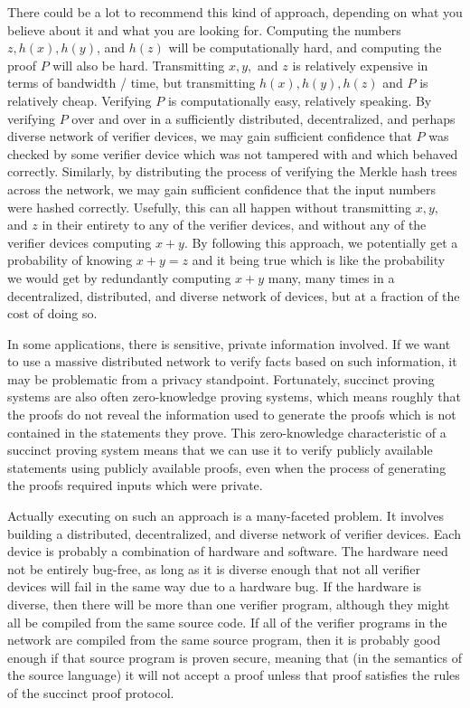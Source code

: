 \documentclass[11pt]{article}
\begin{document}
There could be a lot to recommend this kind of approach, depending on
what you believe about it and what you are looking for. Computing the numbers $z, h(x), h(y)$,
and $h(z)$ will be computationally hard, and computing the proof $P$ will also be hard.
Transmitting $x, y,$ and $z$ is relatively expensive in terms of bandwidth / time,
but transmitting $h(x), h(y), h(z)$ and $P$ is relatively cheap. Verifying $P$ is
computationally easy, relatively speaking. By verifying $P$ over and over in a sufficiently
distributed, decentralized, and perhaps diverse network of verifier devices, we may gain
sufficient confidence that $P$ was checked by some verifier device which was not tampered
with and which behaved correctly. Similarly, by distributing the process of verifying
the Merkle hash trees across the network, we may gain sufficient confidence that the
input numbers were hashed correctly. Usefully, this can all happen without transmitting
$x, y,$ and $z$ in their entirety to any of the verifier devices, and without any
of the verifier devices computing $x + y$. By following this approach, we potentially get
a probability of knowing $x + y = z$ and it being true which is like the probability we
would get by redundantly computing $x + y$ many, many times in a decentralized, distributed,
and diverse network of devices, but at a fraction of the cost of doing so.

In some applications, there is sensitive, private information involved. If we want to
use a massive distributed network to verify facts based on such information, it may
be problematic from a privacy standpoint. Fortunately, succinct proving systems are also
often zero-knowledge proving systems, which means roughly that the proofs do not reveal the
information used to generate the proofs which is not contained in the statements they prove.
This zero-knowledge characteristic of a succinct proving system means that we can use it
to verify publicly available statements using publicly available proofs, even when the process
of generating the proofs required inputs which were private.

Actually executing on such an approach is a many-faceted problem. It involves building
a distributed, decentralized, and diverse network of verifier devices. Each device is probably a
combination of hardware and software. The hardware need not be entirely bug-free, as long as it
is diverse enough that not all verifier devices will fail in the same way due to a hardware bug.
If the hardware is diverse, then there will be more than one verifier program, although they
might all be compiled from the same source code. If all of the verifier programs in the network
are compiled from the same source program, then it is probably good enough if that source
program is proven secure, meaning that (in the semantics of the source language) it will not
accept a proof unless that proof satisfies the rules of the succinct proof protocol.
\end{document}
